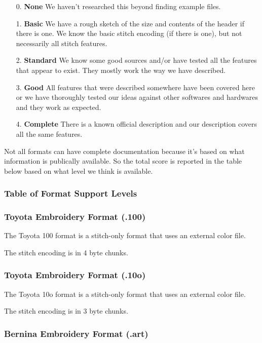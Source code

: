 \documentclass[a4paper, 11pt]{report}
\begin{document}
\begin{enumerate}
\item[0.] \textbf{None} We haven't researched this beyond finding example files.
\item[1.] \textbf{Basic} We have a rough sketch of the size and contents of the header if there is one. We know the basic stitch encoding (if there is one), but not necessarily all stitch features. 
\item[2.] \textbf{Standard} We know some good sources and/or have tested all the features that appear to exist. They mostly work the way we have described.
\item[3.] \textbf{Good} All features that were described somewhere have been covered here or we have thoroughly tested our ideas against other softwares and hardwares and they work as expected. 
\item[4.] \textbf{Complete} There is a known official description and our description covers all the same features.
\end{enumerate}

Not all formats can have complete documentation because it's based on what 
information is publically available. So the total score is reported in the table
below based on what level we think is available.

\subsubsection{Table of Format Support Levels}



\subsubsection{Toyota Embroidery Format (.100)}

The Toyota 100 format is a stitch-only format that uses an external color file.

The stitch encoding is in 4 byte chunks.

\subsubsection{Toyota Embroidery Format (.10o)}

The Toyota 10o format is a stitch-only format that uses an external color file.

The stitch encoding is in 3 byte chunks.

\subsubsection{Bernina Embroidery Format (.art)}
\end{document}

